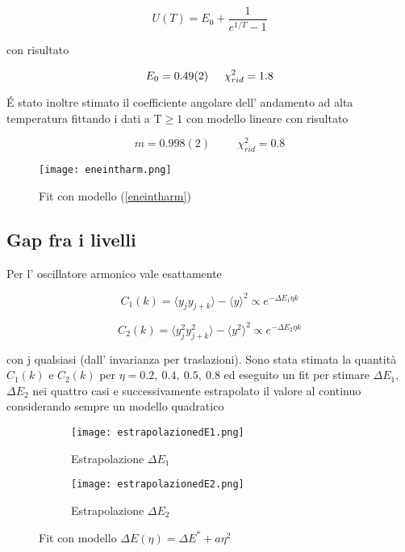 \documentclass{article}
\begin{document}
\begin{equation}
    U(T) = E_0 + \frac{1}{e^{1/T}-1}
    \label{eneintharm}
\end{equation}

con risultato 

$$E_0 = 0.49(2) \hspace{0.5cm} \chi^2_{rid}=1.8$$

\'E stato inoltre stimato il coefficiente angolare dell' andamento ad alta temperatura fittando i dati a T$\geq 1$ con modello lineare con risultato 

$$m = 0.998(2)\hspace{1cm}\chi^2_{rid}=0.8$$

\begin{figure}
    \centering
    \texttt{[image: eneintharm.png]}
    \caption{Fit con modello (\ref{eneintharm})}
    \label{fig:eneintharm}
\end{figure}
\newpage
\subsection{Gap fra i livelli}

Per l' oscillatore armonico vale esattamente 

\begin{equation}
C_1(k) = \langle y_jy_{j+k}\rangle - \langle y\rangle^2\propto e^{-\Delta E_1\eta k}
\label{c1k}
\end{equation}

\begin{equation}
    C_2(k) = \langle y_j^2y_{j+k}^2\rangle - \langle y^2\rangle^2\propto e^{-\Delta E_2\eta k}
    \label{c2k}
\end{equation}

con j qualsiasi (dall' invarianza per traslazioni). Sono stata stimata la quantità $C_1(k)$ e $C_2(k)$ per $\eta = 0.2,\ 0.4,\ 0.5,\ 0.8$ ed eseguito un fit per stimare $\Delta E_1$,$\Delta E_2$ nei quattro casi e successivamente estrapolato il valore al continuo considerando sempre un modello quadratico

\begin{figure}[h]
     \centering
     \begin{subfigure}[b]{0.48\textwidth}
         \centering
         \texttt{[image: estrapolazionedE1.png]}
         \caption{Estrapolazione $\Delta E_1$}
         \label{fig:de1}
     \end{subfigure}
     \hfill
     \begin{subfigure}[b]{0.48\textwidth}
         \centering
         \texttt{[image: estrapolazionedE2.png]}
         \caption{Estrapolazione $\Delta E_2$}
         \label{fig:de2}
     \end{subfigure}
     \hfill
        \caption{Fit con modello $\Delta E(\eta) = \Delta E^{*}+a\eta^2$}
        \label{fig:estrap harm}
\end{figure}
\end{document}
